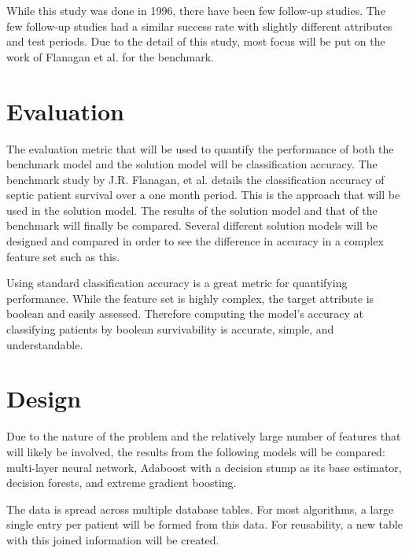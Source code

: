 \documentclass[11pt]{article}
\begin{document}
While this study was done in 1996, there have been few follow-up studies. The few follow-up studies had a similar success rate with slightly different attributes and test periods. Due to the detail of this study, most focus will be put on the work of Flanagan et al. for the benchmark.

\section{Evaluation}
The evaluation metric that will be used to quantify the performance of both the benchmark model and the solution model will be classification accuracy. The benchmark study by J.R. Flanagan, et al. details the classification accuracy of septic patient survival over a one month period. This is the approach that will be used in the solution model. The results of the solution model and that of the benchmark will finally be compared. Several different solution models will be designed and compared in order to see the difference in accuracy in a complex feature set such as this.

Using standard classification accuracy is a great metric for quantifying performance. While the feature set is highly complex, the target attribute is boolean and easily assessed. Therefore computing the model's accuracy at classifying patients by boolean survivability is accurate, simple, and understandable.

\section{Design}
Due to the nature of the problem and the relatively large number of features that will likely be involved, the results from the following models will be compared: multi-layer neural network, Adaboost with a decision stump as its base estimator, decision forests, and extreme gradient boosting.

The data is spread across multiple database tables. For most algorithms, a large single entry per patient will be formed from this data. For reusability, a new table with this joined information will be created.
\end{document}
